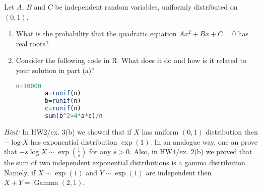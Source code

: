 
\begin{exercise}

Let $A$, $B$ and $C$ be independent random variables, uniformly distributed on $(0, 1)$.

\begin{enumerate}[label = (\alph*)]

    \item What is the probability that the quadratic equation $A x^2 + B x + C = 0$ has real roots?

    \item Consider the following code in R.
    What does it do and how is it related to your solution in part (a)?

    \lstset{style = stackexchangeR}
    \begin{lstlisting}[language = R]
        n=10000
        a=runif(n)
        b=runif(n)
        c=runif(n)
        sum(b^2>4*a*c)/n
    \end{lstlisting}

\end{enumerate}

\textit{Hint:}
In HW2/ex. 3(b) we showed that if $X$ has uniform $(0, 1)$ distribution then $-\log X$ has exponential distribution $\exp(1)$.
In an analogue way, one an prove that $-s \log X \sim \exp(\frac{1}{s})$ for any $s > 0$.
Also, in HW4/ex. 2(b) we proved that the sum of two independent exponential distributions is a gamma distribution.
Namely, if $X \sim \exp(1)$ and $Y \sim \exp(1)$ are independent then $X + Y = \operatorname{Gamma}(2, 1)$.

\end{exercise}


